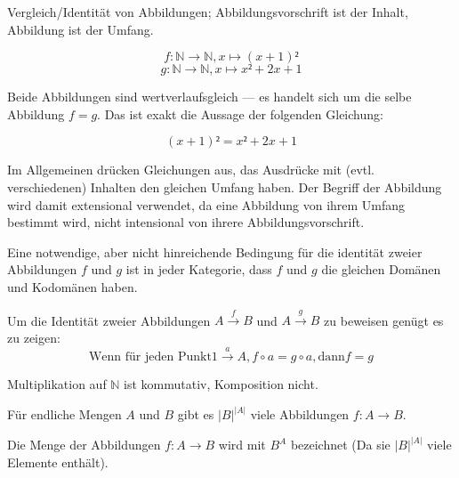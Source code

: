 \documentclass[parskip=half]{scrreprt}
\begin{document}
Vergleich/Identität von Abbildungen;
Abbildungsvorschrift ist der Inhalt, Abbildung ist der Umfang.

\begin{example}
$$f : ℕ → ℕ, x ↦ (x+1)²$$
$$g : ℕ → ℕ, x ↦ x²+2x+1$$

Beide Abbildungen sind wertverlaufsgleich --- es handelt sich um die selbe
Abbildung $f=g$. Das ist exakt die Aussage der folgenden Gleichung:

$$ (x+1)² = x²+2x+1$$

Im Allgemeinen drücken Gleichungen aus, das Ausdrücke mit (evtl. verschiedenen)
Inhalten den gleichen Umfang haben.
Der Begriff der Abbildung wird damit extensional verwendet,
da eine Abbildung von ihrem Umfang bestimmt wird, nicht intensional von  
ihrere Abbildungsvorschrift.
\end{example}

\begin{remark}
Eine notwendige, aber nicht hinreichende Bedingung für die identität zweier 
Abbildungen $f$ und $g$ ist in jeder Kategorie, dass $f$ und $g$ die gleichen 
Domänen und Kodomänen haben.
\end{remark}

\begin{remark}
Um die Identität zweier Abbildungen $A \xrightarrow{f} B$ und $A \xrightarrow{g} B$
zu beweisen genügt es zu zeigen:
$$\text{Wenn für jeden Punkt} 1 \xrightarrow{a} A, f ∘ a = g ∘ a, \text{dann} f=g$$
\end{remark}


\begin{remark}
Multiplikation auf $ℕ$ ist kommutativ, Komposition nicht.
\end{remark}


\begin{remark}
Für endliche Mengen $A$ und $B$ gibt es $|B|^{|A|}$ viele Abbildungen 
$f : A → B$.
\end{remark}



\begin{remark}
Die Menge der Abbildungen $f : A → B$ wird mit $B^A$ bezeichnet
(Da sie $|B|^{|A|}$ viele Elemente enthält).
\end{remark}
\end{document}
